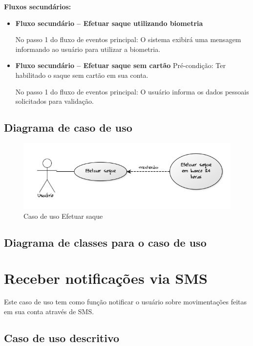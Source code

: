 \textbf{Fluxos secundários:}

\begin{itemize}
  \item \textbf{Fluxo secundário – Efetuar saque utilizando biometria}

  No passo 1 do fluxo de eventos principal:
  \subitem O sistema exibirá uma mensagem informando ao usuário para utilizar a biometria.

  \item \textbf{Fluxo secundário – Efetuar saque sem cartão}
  Pré-condição: Ter habilitado o saque sem cartão em sua conta.

  No passo 1 do fluxo de eventos principal:
  \subitem O usuário informa os dados pessoais solicitados para validação.

\end{itemize}

\subsection{Diagrama de caso de uso}

\begin{figure}[!htb]
     \centering
     \includegraphics[scale=0.6]{diagramas/caso-de-uso/imagens/efetuarSaque.png}
     \caption{Caso de uso Efetuar saque}
\end{figure}

\subsection{Diagrama de classes para o caso de uso}

\section{Receber notificações via SMS}
\label{sec:ReceberSMS}

Este caso de uso tem como função notificar o usuário sobre movimentações feitas em sua conta através de SMS.

\subsection{Caso de uso descritivo}

